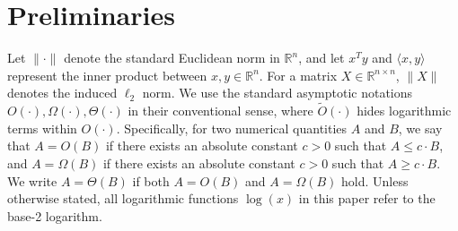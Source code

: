 \documentclass{article}
\begin{document}

\section{Preliminaries}
\label{sec.priliminary}
Let $\|\cdot\|$ denote the standard Euclidean norm in $\mathbb{R}^n$, and let $x^T y$ and $\langle x,y\rangle$ represent the inner product between $x, y \in \mathbb{R}^n$. For a matrix $X \in \mathbb{R}^{n \times n}$, $\|X\|$ denotes the induced $\ell_2$ norm. We use the standard asymptotic notations $O(\cdot), \Omega(\cdot), \Theta(\cdot)$ in their conventional sense, where $\tilde{O}(\cdot)$ hides logarithmic terms within $O(\cdot)$. Specifically, for two numerical quantities $A$ and $B$, we say that $A = O(B)$ if there exists an absolute constant $c > 0$ such that $A \leq c \cdot B$, and $A = \Omega(B)$ if there exists an absolute constant $c > 0$ such that $A \geq c \cdot B$. We write $A = \Theta(B)$ if both $A = O(B)$ and $A = \Omega(B)$ hold. Unless otherwise stated, all logarithmic functions $\log(x)$ in this paper refer to the base-2 logarithm.
\end{document}
